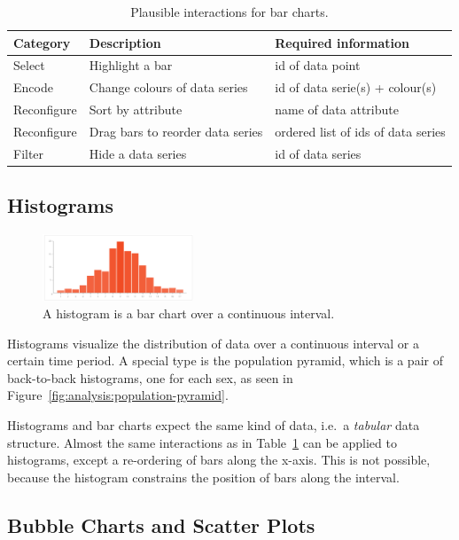 \begin{table}[H]
  \centering
  \caption{Plausible interactions for bar charts.}
  \label{tab:analysis:bar-charts:interactions}
  \begin{tabular*}{\textwidth}{lll}
    \bf Category & \bf Description & \bf Required information \\
    \hline
    Select & Highlight a bar & id of data point \\
    Encode & Change colours of data series & id of data serie(s) + colour(s) \\
    Reconfigure & Sort by attribute & name of data attribute \\
    Reconfigure & Drag bars to reorder data series & ordered list of ids of data series \\
    Filter & Hide a data series & id of data series \\
  \end{tabular*}
\end{table}

\subsection{Histograms}

\begin{figure}
  \centering
  \label{fig:analysis:histograms}
  \caption{A histogram is a bar chart over a continuous interval.}%
  \includegraphics[width=0.4\textwidth]{figures/analysis/histogram.png}%
\end{figure}

Histograms visualize the distribution of data over a continuous interval or a certain time period.
A special type is the population pyramid, which is a pair of back-to-back histograms, one for each sex, as seen in Figure~\ref{fig:analysis:population-pyramid}.

Histograms and bar charts expect the same kind of data, i.e.\ a \emph{tabular} data structure.
Almost the same interactions as in Table~\ref{tab:analysis:bar-charts:interactions} can be applied to histograms, except a re-ordering of bars along the x-axis.
This is not possible, because the histogram constrains the position of bars along the interval.

\subsection{Bubble Charts and Scatter Plots}

